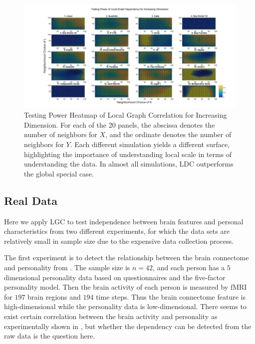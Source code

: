 \documentclass[11pt]{article}
\begin{document}
\begin{figure}[htbp]
\includegraphics[width=1.0\textwidth]{../Figures/Fig6s}
\caption{Testing Power Heatmap of Local Graph Correlation for Increasing Dimension.
For each of the 20 panels, the abscissa denotes the number of neighbors for $X$, and the ordinate denotes the number of neighbors for $Y$.  Each different simulation yields a different surface, highlighting the importance of understanding local scale in terms of understanding the data. In almost all simulations, LDC outperforms the global special case.}
\label{figSim2}
\end{figure}







\subsection{Real Data}
\label{numer2}
Here we apply LGC to test independence between brain features and personal characteristics from two different experiments, for which the data sets are relatively small in sample size due to the expensive data collection process. 

The first experiment is to detect the relationship between the brain connectome and personality from \cite{AdelsteinEtAl2011}. The sample size is $n=42$, and each person has a $5$ dimensional personality data based on questionnaires and the five-factor personality model. Then the brain activity of each person is measured by fMRI for $197$ brain regions and $194$ time steps. Thus the brain connectome feature is high-dimensional while the personality data is low-dimensional. There seems to exist certain correlation between the brain activity and personality as experimentally shown in \cite{AdelsteinEtAl2011}, but whether the dependency can be detected from the raw data is the question here.
\end{document}
